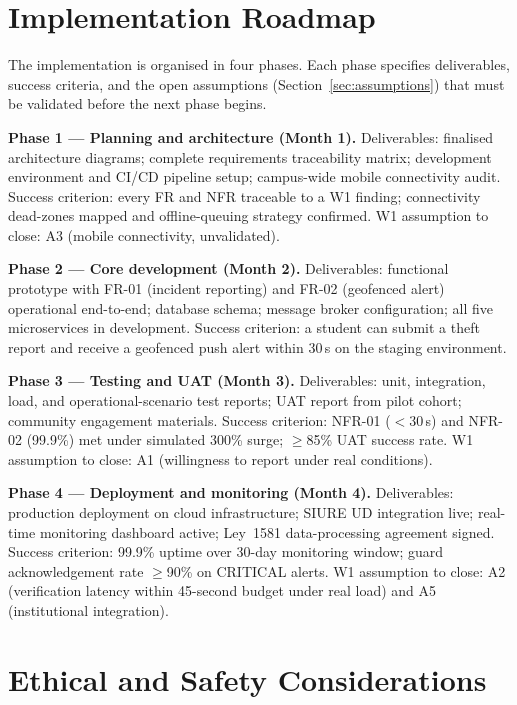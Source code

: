 \documentclass[12pt,a4paper]{article}
\begin{document}
\section{Implementation Roadmap}
\label{sec:roadmap}

The implementation is organised in four phases. Each phase specifies
deliverables, success criteria, and the open assumptions
(Section~\ref{sec:assumptions}) that must be validated before the
next phase begins.

\textbf{Phase 1 --- Planning and architecture (Month 1).}
Deliverables: finalised architecture diagrams; complete requirements
traceability matrix; development environment and CI/CD pipeline setup;
campus-wide mobile connectivity audit.
Success criterion: every FR and NFR traceable to a W1 finding;
connectivity dead-zones mapped and offline-queuing strategy confirmed.
W1 assumption to close: A3 (mobile connectivity, unvalidated).

\textbf{Phase 2 --- Core development (Month 2).}
Deliverables: functional prototype with FR-01 (incident reporting)
and FR-02 (geofenced alert) operational end-to-end;
database schema; message broker configuration; all five microservices
in development.
Success criterion: a student can submit a theft report and receive a
geofenced push alert within 30\,s on the staging environment.

\textbf{Phase 3 --- Testing and UAT (Month 3).}
Deliverables: unit, integration, load, and operational-scenario test
reports; UAT report from pilot cohort; community engagement materials.
Success criterion: NFR-01 ($<$30\,s) and NFR-02 (99.9\%) met under
simulated 300\% surge; $\geq$85\% UAT success rate.
W1 assumption to close: A1 (willingness to report under real
conditions).

\textbf{Phase 4 --- Deployment and monitoring (Month 4).}
Deliverables: production deployment on cloud infrastructure;
SIURE UD integration live; real-time monitoring dashboard active;
Ley~1581 data-processing agreement signed.
Success criterion: 99.9\% uptime over 30-day monitoring window;
guard acknowledgement rate $\geq$90\% on CRITICAL alerts.
W1 assumption to close: A2 (verification latency within 45-second
budget under real load) and A5 (institutional integration).

\section{Ethical and Safety Considerations}
\end{document}
